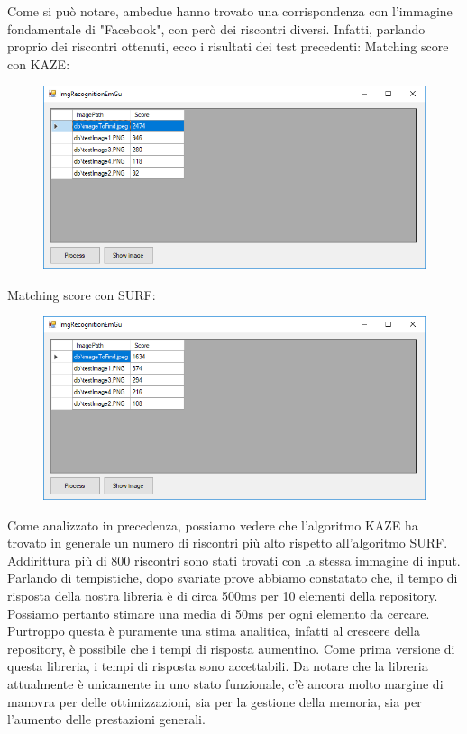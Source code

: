 \documentclass[twoside]{supsistudent}
\newcommand{\Decaa}{\newline\vspace{0.5mm}\newline\noindent}
\begin{document}
\newline
Come si può notare, ambedue hanno trovato una corrispondenza con l'immagine fondamentale di "Facebook", con però dei riscontri diversi.
\Decaa
Infatti, parlando proprio dei riscontri ottenuti, ecco i risultati dei test precedenti:
\newline
Matching score con KAZE:
\begin{figure}[h!]
  \centering
    \includegraphics[width=1\textwidth]{Pictures/Matching_scores_KAZE.PNG}
\end{figure}
\newline
Matching score con SURF:
\begin{figure}[h!]
  \centering
    \includegraphics[width=1\textwidth]{Pictures/Matching_scores_SURF.PNG}
\end{figure}
\newline
Come analizzato in precedenza, possiamo vedere che l'algoritmo KAZE ha trovato in generale un numero di riscontri più alto rispetto all'algoritmo SURF. Addirittura più di 800 riscontri sono stati trovati con la stessa immagine di input.\Decaa
Parlando di tempistiche, dopo svariate prove abbiamo constatato che, il tempo di risposta della nostra libreria è di circa 500ms per 10 elementi della repository. Possiamo pertanto stimare una media di 50ms per ogni elemento da cercare. Purtroppo questa è puramente una stima analitica, infatti al crescere della repository, è possibile che i tempi di risposta aumentino. \Decaa
Come prima versione di questa libreria, i tempi di risposta sono accettabili. Da notare che la libreria attualmente è unicamente in uno stato funzionale, c'è ancora molto margine di manovra per delle ottimizzazioni, sia per la gestione della memoria, sia per l'aumento delle prestazioni generali.
\end{document}
